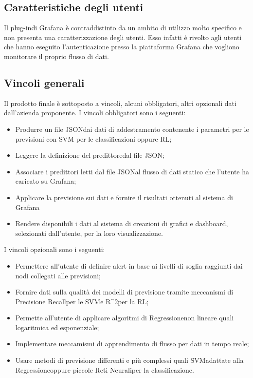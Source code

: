 	\subsection{Caratteristiche degli utenti}
	Il plug-in\glosp di Grafana è contraddistinto da un ambito di utilizzo molto specifico e non presenta una caratterizzazione degli utenti. Esso infatti è rivolto agli utenti che hanno eseguito l'autenticazione presso la piattaforma Grafana che vogliono monitorare il proprio flusso di dati.
	\subsection{Vincoli generali}
	Il prodotto finale è sottoposto a vincoli, alcuni obbligatori, altri opzionali dati dall'azienda proponente.
	I vincoli obbligatori sono i seguenti:
	\begin{itemize}
		\item Produrre un file JSON\glosp dai dati di addestramento contenente i parametri per le previsioni con SVM per le classificazioni oppure RL;
		\item Leggere la definizione del predittore\glosp dal file JSON\glo;
		\item Associare i predittori letti dal file JSON\glosp al flusso di dati statico che l'utente ha caricato su Grafana;
		\item Applicare la previsione sui dati e fornire il risultati ottenuti al sistema di Grafana
		\item Rendere disponibili i dati al sistema di creazioni di grafici e dashboard, selezionati dall'utente, per la loro visualizzazione.
	\end{itemize}
	I vincoli opzionali sono i seguenti:
	\begin{itemize}
		\item Permettere all'utente di definire alert in base ai livelli di soglia raggiunti dai nodi collegati alle previsioni;
		\item Fornire dati sulla qualità dei modelli di previsione tramite meccanismi di Precision\glosp e Recall\glosp per le SVM\glosp e R^2\glosp per la RL\glo;
		\item Permette all'utente di applicare algoritmi di Regressione\glosp non lineare quali logaritmica ed esponenziale;
		\item Implementare meccamismi di apprendimento di flusso per dati in tempo reale;
		\item Usare metodi di previsione differenti e più complessi quali SVM\glosp adattate alla Regressione\glosp oppure piccole Reti Neurali\glosp per la classificazione\glo.
	\end{itemize}
